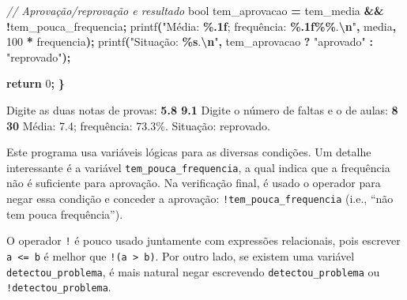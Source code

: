 \documentclass[
  11pt,
  a4paper,
]{scrbook}
\newenvironment{Shaded}{\begin{snugshade}}{\end{snugshade}}
\newcommand{\CommentTok}[1]{\textcolor[rgb]{0.56,0.35,0.01}{\textit{#1}}}
\newcommand{\ControlFlowTok}[1]{\textcolor[rgb]{0.13,0.29,0.53}{\textbf{#1}}}
\newcommand{\DataTypeTok}[1]{\textcolor[rgb]{0.13,0.29,0.53}{#1}}
\newcommand{\DecValTok}[1]{\textcolor[rgb]{0.00,0.00,0.81}{#1}}
\newcommand{\KeywordTok}[1]{\textcolor[rgb]{0.13,0.29,0.53}{\textbf{#1}}}
\newcommand{\NormalTok}[1]{#1}
\newcommand{\OperatorTok}[1]{\textcolor[rgb]{0.81,0.36,0.00}{\textbf{#1}}}
\newcommand{\SpecialCharTok}[1]{\textcolor[rgb]{0.81,0.36,0.00}{\textbf{#1}}}
\newcommand{\StringTok}[1]{\textcolor[rgb]{0.31,0.60,0.02}{#1}}
\begin{document}
\begin{Shaded}
\begin{Highlighting}[]
    \CommentTok{// Aprovação/reprovação e resultado}
    \DataTypeTok{bool}\NormalTok{ tem\_aprovacao }\OperatorTok{=}\NormalTok{ tem\_media }\OperatorTok{\&\&} \OperatorTok{!}\NormalTok{tem\_pouca\_frequencia}\OperatorTok{;}
\NormalTok{    printf}\OperatorTok{(}\StringTok{"Média: }\SpecialCharTok{\%.1f}\StringTok{; frequência: }\SpecialCharTok{\%.1f\%\%}\StringTok{.}\SpecialCharTok{\textbackslash{}n}\StringTok{"}\OperatorTok{,}\NormalTok{ media}\OperatorTok{,} \DecValTok{100} \OperatorTok{*}\NormalTok{ frequencia}\OperatorTok{);}
\NormalTok{    printf}\OperatorTok{(}\StringTok{"Situação: }\SpecialCharTok{\%s}\StringTok{.}\SpecialCharTok{\textbackslash{}n}\StringTok{"}\OperatorTok{,}\NormalTok{ tem\_aprovacao }\OperatorTok{?} \StringTok{"aprovado"} \OperatorTok{:} \StringTok{"reprovado"}\OperatorTok{);}

    \ControlFlowTok{return} \DecValTok{0}\OperatorTok{;}
\OperatorTok{\}}
\end{Highlighting}
\end{Shaded}

\begin{Shaded}
\begin{Highlighting}[]
\NormalTok{Digite as duas notas de provas: }\KeywordTok{ 5.8 9.1 }
\NormalTok{Digite o número de faltas e o de aulas: }\KeywordTok{ 8 30 }
\NormalTok{Média: 7.4; frequência: 73.3\%.}
\NormalTok{Situação: reprovado.}
\end{Highlighting}
\end{Shaded}

Este programa usa variáveis lógicas para as diversas condições. Um
detalhe interessante é a variável \texttt{tem\_pouca\_frequencia}, a
qual indica que a frequência não é suficiente para aprovação. Na
verificação final, é usado o operador
{} para negar
essa condição e conceder a aprovação: \texttt{!tem\_pouca\_frequencia}
(i.e., ``não tem pouca frequência'').

O operador \texttt{!} é pouco usado juntamente com expressões
relacionais, pois escrever \texttt{a\ \textless{}=\ b} é melhor que
\texttt{!(a\ \textgreater{}\ b)}. Por outro lado, se existem uma
variável \texttt{detectou\_problema}, é mais natural negar escrevendo
\texttt{detectou\_problema} ou \texttt{!detectou\_problema}.
\end{document}
